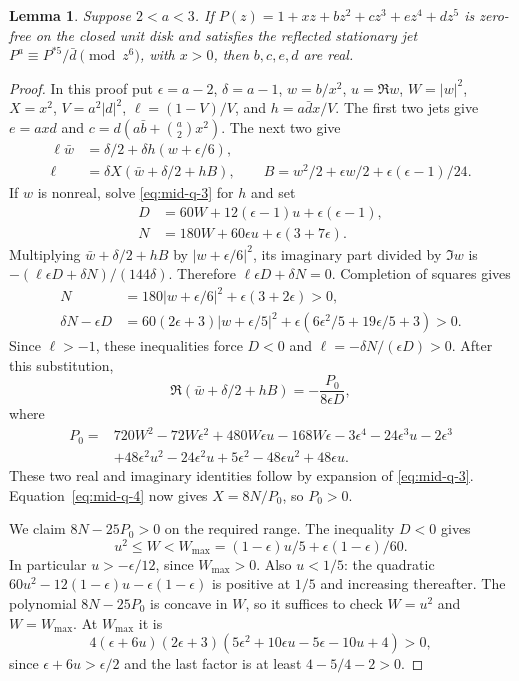 \documentclass[11pt]{article}
\newtheorem{lemma}[theorem]{Lemma}
\begin{document}
\begin{lemma}\label{lem:middle-real-phase}
Suppose \(2<a<3\). If
\(P(z)=1+xz+bz^2+cz^3+ez^4+dz^5\) is zero-free on the closed
unit disk and satisfies the reflected stationary jet
\(P^a\equiv P^{*5}/\bar d\pmod {z^6}\), with \(x>0\), then
\(b,c,e,d\) are real.
\end{lemma}

\begin{proof}
In this proof put \(\epsilon=a-2\), \(\delta=a-1\), \(w=b/x^2\),
\(u=\Re w\), \(W=|w|^2\), \(X=x^2\), \(V=a^2|d|^2\),
\(\ell=(1-V)/V\), and \(h=a\bar d x/V\).
The first two jets give \(e=axd\) and
\(c=d(a\bar b+\binom a2 x^2)\). The next two give
\begin{align}
 \ell\bar w&=\delta/2+\delta h(w+\epsilon/6), \label{eq:mid-q-3}\\
 \ell&=\delta X\left(\bar w+\delta/2+h B\right),
 \qquad B=w^2/2+\epsilon w/2+\epsilon(\epsilon-1)/24 .
 \label{eq:mid-q-4}
\end{align}
If \(w\) is nonreal, solve \eqref{eq:mid-q-3} for \(h\) and set
\begin{align*}
 D&=60W+12(\epsilon-1)u+\epsilon(\epsilon-1),\\
 N&=180W+60\epsilon u+\epsilon(3+7\epsilon).
\end{align*}
Multiplying \(\bar w+\delta/2+h B\) by \(|w+\epsilon/6|^2\),
its imaginary part divided by \(\Im w\) is
\(-(\ell\epsilon D+\delta N)/(144\delta)\). Therefore
\(\ell\epsilon D+\delta N=0\). Completion of squares gives
\begin{align*}
 N&=180|w+\epsilon/6|^2+\epsilon(3+2\epsilon)>0,\\
 \delta N-\epsilon D
 &=60(2\epsilon+3)|w+\epsilon/5|^2
    +\epsilon(6\epsilon^2/5+19\epsilon/5+3)>0 .
\end{align*}
Since \(\ell>-1\), these inequalities force \(D<0\) and
\(\ell=-\delta N/(\epsilon D)>0\).
After this substitution,
\[
 \Re(\bar w+\delta/2+hB)=-\frac{P_0}{8\epsilon D},
\]
where
\begin{align*}
P_0={}&720W^2-72W\epsilon^2+480W\epsilon u-168W\epsilon
       -3\epsilon^4-24\epsilon^3u-2\epsilon^3\\
     &+48\epsilon^2u^2-24\epsilon^2u+5\epsilon^2
       -48\epsilon u^2+48\epsilon u.
\end{align*}
These two real and imaginary identities follow by expansion of
\eqref{eq:mid-q-3}. Equation~\eqref{eq:mid-q-4} now gives
\(X=8N/P_0\), so \(P_0>0\).

We claim \(8N-25P_0>0\) on the required range.
The inequality \(D<0\) gives
\[
 u^2\leq W<W_{\max}=(1-\epsilon)u/5+\epsilon(1-\epsilon)/60.
\]
In particular \(u>-\epsilon/12\), since \(W_{\max}>0\).
Also \(u<1/5\): the quadratic
\(60u^2-12(1-\epsilon)u-\epsilon(1-\epsilon)\) is positive
at \(1/5\) and increasing thereafter.
The polynomial \(8N-25P_0\) is concave in \(W\), so it
suffices to check \(W=u^2\) and \(W=W_{\max}\).
At \(W_{\max}\) it is
\[
 4(\epsilon+6u)(2\epsilon+3)
       (5\epsilon^2+10\epsilon u-5\epsilon-10u+4)>0,
\]
since \(\epsilon+6u>\epsilon/2\) and the last factor is at
least \(4-5/4-2>0\).


\end{proof}
\end{document}
